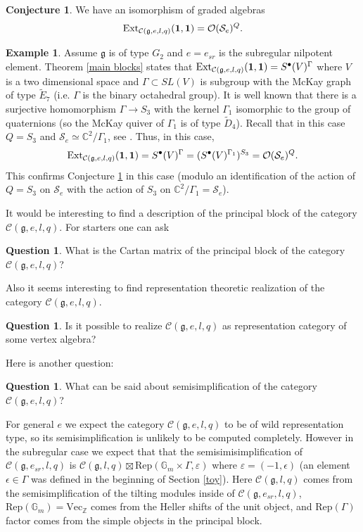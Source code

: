 \documentclass{amsart}
\theoremstyle{definition}
\newtheorem{example}[theorem]{Example}
\newtheorem{question}[theorem]{Question}
\newtheorem{conjecture}[theorem]{Conjecture}
\newcommand{\G}{\mathbb{G}}
\newcommand{\C}{\mathcal{C}}
\newcommand{\Sl}{\mathcal{S}}
\newcommand{\BC}{\mathbb{C}}
\newcommand{\Z}{\mathbb{Z}}
\newcommand{\g}{\mathfrak{g}}
\newcommand{\mO}{\mathcal{O}}
\newcommand{\Rep}{\text{Rep}}
\newcommand{\be}{{\bf 1}}
\numberwithin{equation}{section}
\begin{document}
\begin{conjecture}\label{Slod}
    We have an isomorphism of graded algebras
$$\mbox{Ext}_{\C(\g,e,l,q)}(\be,\be)=\mO(\Sl_e)^Q.$$
\end{conjecture}

\begin{example}
    Assume $\g$ is of type $G_2$ and $e=e_{sr}$ is the subregular nilpotent element.
    Theorem \ref{main blocks} states that $\mbox{Ext}_{\C(\g,e,l,q)}(\be,\be)=S^\bullet(V)^\Gamma$ where $V$ is a two dimensional space and $\Gamma \subset SL(V)$ is subgroup with the McKay graph of type $\tilde E_7$ (i.e. $\Gamma$ is the binary octahedral group). It is well known that there is a surjective homomorphism
    $\Gamma \to S_3$ with the kernel $\Gamma_1$ isomorphic to the group of quaternions
    (so the McKay quiver of $\Gamma_1$ is of type $\tilde D_4$). Recall that in this case
    $Q=S_3$ and $\Sl_e\simeq \BC^2/\Gamma_1$, see \cite{Sl}. Thus, in this case,
    $$\mbox{Ext}_{\C(\g,e,l,q)}(\be,\be)=S^\bullet(V)^\Gamma=(S^\bullet(V)^{\Gamma_1})^{S_3}=\mO(\Sl_e)^Q.$$
    This confirms Conjecture \ref{Slod} in this case (modulo an identification of the
    action of $Q=S_3$ on $\Sl_e$ with the action of $S_3$ on $\BC^2/\Gamma_1=\Sl_e$).
\end{example}

It would be interesting to find a description of the principal block of
the category $\C(\g,e,l,q)$. For starters one can ask

\begin{question}
    What is the Cartan matrix of the principal block of the category $\C(\g,e,l,q)$?
\end{question}

Also it seems interesting to find representation theoretic realization
of the category $\C(\g,e,l,q)$.

\begin{question}
    Is it possible to realize $\C(\g,e,l,q)$ as representation category of some
    vertex algebra?
\end{question}

Here is another question:

\begin{question}
    What can be said about semisimplification of the category $\C(\g,e,l,q)$?
\end{question}

For general $e$ we expect the category $\C(\g,e,l,q)$ to be of wild representation
type, so its semisimplification is unlikely to be computed completely. However in the subregular case we expect that that the semisimisimplification 
of $\C(\g,e_{sr},l,q)$ is $\C(\g,l,q)\boxtimes \Rep(\G_m\times \Gamma,\varepsilon)$
where $\varepsilon =(-1,\epsilon)$ (an element $\epsilon \in \Gamma$ was defined
in the beginning of Section \ref{toy}). Here $\C(\g,l,q)$ comes from the semisimplification of the tilting modules inside of $\C(\g,e_{sr},l,q)$,
$\Rep(\G_m)=\mbox{Vec}_\Z$ comes from the Heller shifts of the unit object,
and $\Rep(\Gamma)$ factor comes from the simple objects in the principal block.
\end{document}
